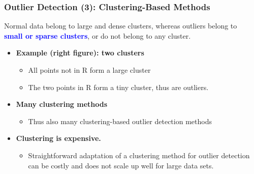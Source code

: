 \documentclass[aspectratio=169,t,xcolor=dvipsnames]{beamer}
\newcommand{\blue}[1]{\textbf{\textcolor{blue}{#1}}}
\begin{document}
\begin{frame}
	\frametitle{Outlier Detection (3): Clustering-Based Methods}
	Normal data belong to large and dense clusters, whereas outliers belong to\\ \blue{small or sparse clusters}, or do not belong to any cluster.
	\begin{itemize}
		
	\item \textbf{Example (right figure): two clusters}
	\begin{itemize}
		\item All points not in R form a large cluster
		\item The two points in R form a tiny cluster, thus are outliers.

	\end{itemize}
	\item \textbf{Many clustering methods}
	\begin{itemize}
		\item Thus also many clustering-based outlier detection methods
	\end{itemize}
	\item \textbf{Clustering is expensive.}
	\begin{itemize}
		\item Straightforward adaptation of a clustering method for outlier detection can be costly and does not scale up well for large data sets.
	\end{itemize}
	\end{itemize}
	

\end{frame}
\end{document}
